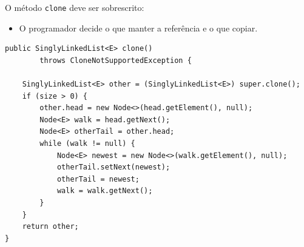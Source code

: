 O método \texttt{clone} deve ser sobrescrito:
\begin{itemize}
	\color{redtext}
	\item O programador decide o que manter a referência e o que copiar.
\end{itemize}

\bigskip

\begin{verbatim}
public SinglyLinkedList<E> clone()
	    throws CloneNotSupportedException {
	    	
	SinglyLinkedList<E> other = (SinglyLinkedList<E>) super.clone();
	if (size > 0) {
		other.head = new Node<>(head.getElement(), null);
		Node<E> walk = head.getNext();
		Node<E> otherTail = other.head;
		while (walk != null) {
			Node<E> newest = new Node<>(walk.getElement(), null);
			otherTail.setNext(newest);
			otherTail = newest;
			walk = walk.getNext();
		}
	}
	return other;
}
\end{verbatim}

\clearpage



